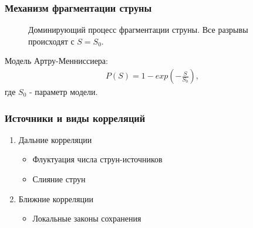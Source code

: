 \documentclass{beamer}
\renewcommand{\l}{\left( }
\renewcommand{\r}{\right) }
\newcommand{\br}[1]{\l {#1} \r}
\newcommand{\abs}[1]{\left| #1 \right|}
\begin{document}
\begin{frame}[fragile]
\frametitle{Механизм фрагментации струны}
\begin{minipage}[h]{0.58\linewidth}
\begin{figure}
\caption{Доминирующий процесс фрагментации струны. 
Все разрывы происходят с $S = S_0$.\footnotemark}
\label{fragmentation}
\end{figure}
\end{minipage}
\hfill
\begin{minipage}[h]{0.38\linewidth}
Модель Артру-Менниссиера\footnotemark:
\begin{gather}
P \br{S} = 1 - exp \br{-\frac{S}{S_0}}, \nonumber
\end{gather}
где $S_0$ - параметр модели.
$$$$
\center{\fbox{Вывод: $\abs{\Delta \eta} \approx 1$}}
\end{minipage}
\end{frame}

\begin{frame}[fragile]
\frametitle{Источники и виды корреляций}
\begin{enumerate}
\item Дальние корреляции
    \begin{itemize}
    \item Флуктуация числа струн-источников
    \item Слияние струн 
    \end{itemize}
\item Ближние корреляции
    \begin{itemize}
    \item Локальные законы сохранения
    \end{itemize}
\end{enumerate}
\end{frame}
\end{document}
